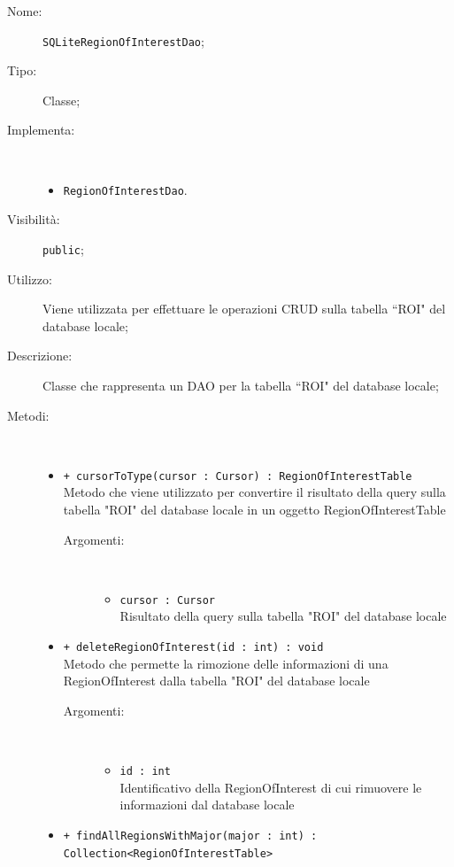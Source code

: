 \documentclass[../DefinizioneDiProdotto.tex]{subfiles}
\begin{document}
    \begin{description}
\item[Nome:] \texttt{SQLiteRegionOfInterestDao};
\item[Tipo:] Classe;
\item[Implementa:] \
\begin{itemize}
\item \texttt{RegionOfInterestDao}.

\end{itemize}
\item[Visibilità:] \texttt{public};
\item[Utilizzo:] Viene utilizzata per effettuare le operazioni CRUD sulla tabella “ROI" del database locale;
\item[Descrizione:] Classe che rappresenta un DAO per la tabella “ROI" del database locale;
\item[Metodi:] \
\begin{itemize}
\item \texttt{+ cursorToType(cursor : Cursor) : RegionOfInterestTable}\\
Metodo che viene utilizzato per convertire il risultato della query sulla tabella "ROI" del database locale in un oggetto RegionOfInterestTable
 \begin{description}
\item[Argomenti:] \
\begin{itemize}
\item \texttt{cursor : Cursor}\\
Risultato della query sulla tabella "ROI" del database locale\end{itemize}
\end{description}
\item \texttt{+ deleteRegionOfInterest(id : int) : void}\\
Metodo che permette la rimozione delle informazioni di una RegionOfInterest dalla tabella "ROI" del database locale
 \begin{description}
\item[Argomenti:] \
\begin{itemize}
\item \texttt{id : int}\\
Identificativo della RegionOfInterest di cui rimuovere le informazioni dal database locale\end{itemize}
\end{description}
\item \texttt{+ findAllRegionsWithMajor(major : int) : Collection<RegionOfInterestTable>}\\

\end{itemize}
\end{description}
\end{document}
